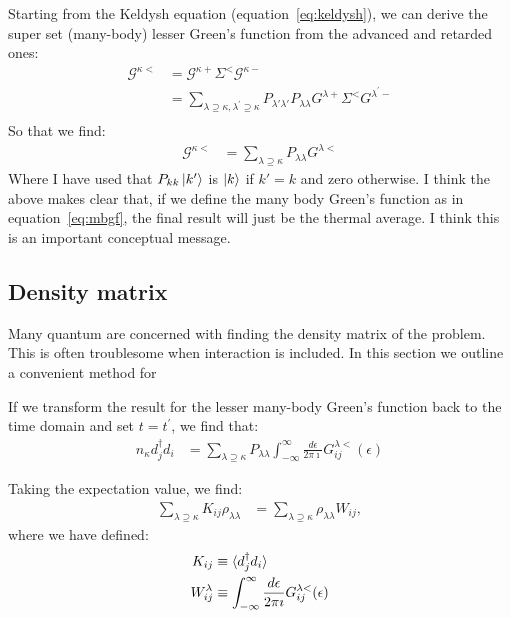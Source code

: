 Starting from the Keldysh equation (equation~\ref{eq:keldysh}), we can derive the super set (many-body) lesser Green's function from the advanced and retarded ones:
\begin{align*}
    \mathscr{G}^{\kappa<} &= \mathscr{G}^{\kappa+} \Sigma^< \mathscr{G}^{\kappa-} \\
    &= \sum_{\lambda\supseteq\kappa, \lambda^\prime \supseteq\kappa}P_{\lambda'\lambda'} P_{\lambda\lambda} G^{\lambda+} \Sigma^< G^{\lambda^\prime-} \\
\end{align*}
So that we find:
\begin{align}
    \mathscr{G}^{\kappa<} &= \sum_{\lambda\supseteq\kappa} P_{\lambda\lambda} G^{\lambda<} \label{eq:mblessergf}
\end{align}
Where I have used that $P_{kk} \ket{k'}$ is $\ket{k}$ if $k'=k$ and zero otherwise. I think the above makes clear that, if we define the many body Green's function as in equation~\ref{eq:mbgf}, the final result will just be the thermal average. I think this is an important conceptual message.

\subsection{Density matrix}
Many quantum are concerned with finding the density matrix of the problem. This is often troublesome when interaction is included. In this section we outline a convenient method for 

If we transform the result for the lesser many-body Green's function back to the time domain and set $t=t^\prime$, we find that:
\begin{align*}
n_\kappa d_j^\dagger d_i &= \sum_{\lambda\supseteq\kappa} P_{\lambda\lambda} \int^\infty_{-\infty} \frac{d\epsilon}{2\pi\imath} G^{\lambda<}_{ij}(\epsilon)
\end{align*}

Taking the expectation value, we find:
\begin{align*}
    \sum_{\lambda\supseteq\kappa} K_{ij} \rho_{\lambda\lambda} &= \sum_{\lambda\supseteq\kappa} \rho_{\lambda\lambda} W_{ij},
\end{align*}
where we have defined:
\begin{align*}
K_{ij} &\equiv \braket{d_j^\dagger d_i} \\
    W^\lambda_{ij} &\equiv   \int^\infty_{-\infty} \frac{d\epsilon}{2\pi\imath} G^{\lambda<}_{ij}(\epsilon) \\
\end{align*}

